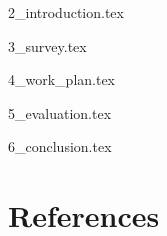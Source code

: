 \documentclass{article}
\newcommand\blankpage{%
    \null
    \thispagestyle{empty}
    \addtocounter{page}{-1}
    \newpage}
\begin{document}

    \maketitle




    \tableofcontents
    \restoregeometry

    \newpage

     {
      \fancyhf{}
      \lhead[\rightmark]{\thepage}
      \rhead[\thepage]{\leftmark}
      \setlength{\parindent}{0pt}
      \setlength{\parskip}{2ex}
    }


    {2_introduction.tex}

    {3_survey.tex}

    {4_work_plan.tex}

    {5_evaluation.tex}

    {6_conclusion.tex}

    \cleardoublepage
    
    \renewcommand*{\refname}{}
    \section{References}
    


\end{document}
